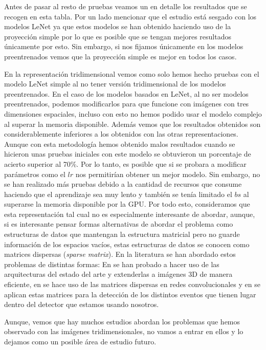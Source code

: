 \documentclass[a4paper,12pt,twoside,titlepage]{article}
\begin{document}
Antes de pasar al resto de pruebas veamos un en detalle los resultados que se recogen en esta tabla. Por un lado mencionar que el estudio está sesgado con los modelos LeNet ya que estos modelos se han obtenido haciendo uso de la proyección simple por lo que es posible que se tengan mejores resultados únicamente por esto. Sin embargo, si nos fijamos únicamente en los modelos preentrenados vemos que la proyección simple es mejor en todos los casos.

En la representación tridimensional vemos como solo hemos hecho pruebas con el modelo LeNet simple al no tener versión tridimensional de los modelos preentrenados. En el caso de los modelos basados en LeNet, al no ser modelos preentrenados, podemos modificarlos para que funcione con imágenes con tres dimensiones espaciales, incluso con esto no hemos podido usar el modelo complejo al superar la memoria disponible. Además vemos que los resultados obtenidos son considerablemente inferiores a los obtenidos con las otras representaciones. Aunque con esta metodología hemos obtenido malos resultados cuando se hicieron unas pruebas iniciales con este modelo se obtuvieron un porcentaje de acierto superior al 70\%. Por lo tanto, es posible que si se probara a modificar parámetros como el $lr$ nos permitirían obtener un mejor modelo. Sin embargo, no se han realizado más pruebas debido a la cantidad de recursos que consume haciendo que el aprendizaje sea muy lento y también se tenía limitado el $bs$ al superarse la memoria disponible por la GPU. Por todo esto, consideramos que esta representación tal cual no es especialmente interesante de abordar, aunque, si es interesante pensar formas alternativas de abordar el problema como estructuras de datos que mantengan la estructura matricial pero no guarde información de los espacios vacíos, estas estructuras de datos se conocen como matrices dispersas (\textit{sparse matrix}). En la literatura se han abordado estos problemas de distintas formas: En \cite{3d_1} se han probado a hacer uso de las arquitecturas del estado del arte y extenderlas a imágenes 3D de manera eficiente, en \cite{3d_sparse} se hace uso de las matrices dispersas en redes convolucionales y en \cite{sparse_neutrino} se aplican estas matrices para la detección de los distintos eventos que tienen lugar dentro del detector que estamos usando nosotros.

Aunque, vemos que hay muchos estudios abordan los problemas que hemos observado con las imágenes tridimensionales, no vamos a entrar en ellos y lo dejamos como un posible área de estudio futuro.
\end{document}
